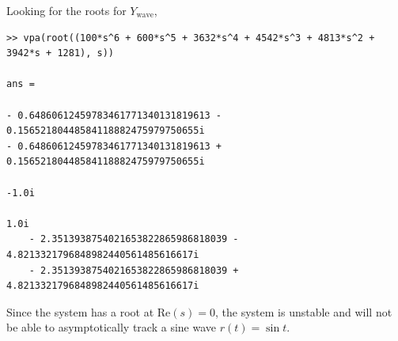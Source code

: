 Looking for the roots for $Y_{\text{wave}}$,
\begin{verbatim}
>> vpa(root((100*s^6 + 600*s^5 + 3632*s^4 + 4542*s^3 + 4813*s^2 + 3942*s + 1281), s))
 
ans =
    
- 0.64860612459783461771340131819613 - 0.15652180448584118882475979750655i
- 0.64860612459783461771340131819613 + 0.15652180448584118882475979750655i
                                                                        -1.0i
                                                                        1.0i
    - 2.3513938754021653822865986818039 - 4.8213321796848982440561485616617i
    - 2.3513938754021653822865986818039 + 4.8213321796848982440561485616617i
\end{verbatim}
Since the system has a root at Re$(s) = 0$, the system is unstable and will not be able to asymptotically track a sine wave $r(t) = \sin t$.

